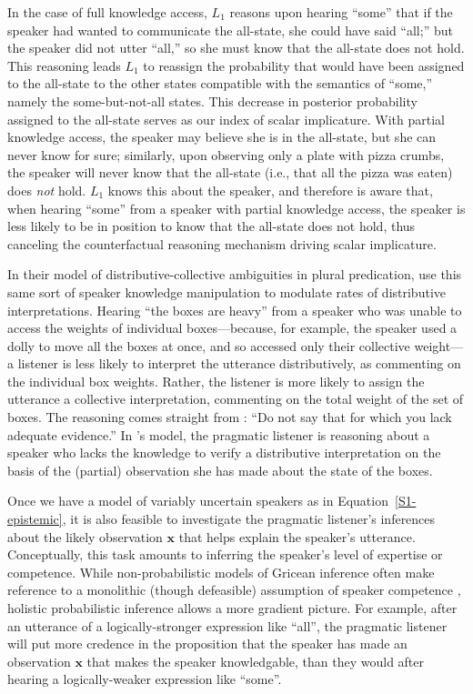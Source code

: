 \documentclass[10pt,letterpaper]{article}
\begin{document}
In the case of full knowledge access, $L_1$ reasons upon hearing ``some'' that if the speaker had wanted to communicate the all-state, she could have said ``all;'' but the speaker did not utter ``all,'' so she must know that the all-state does not hold. This reasoning leads $L_1$ to reassign the probability that would have been assigned to the all-state to the other states compatible with the semantics of ``some,'' namely the some-but-not-all states. This decrease in posterior probability assigned to the all-state serves as our index of scalar implicature. With partial knowledge access, the speaker may believe she is in the all-state, but she can never know for sure; similarly, upon observing only a plate with pizza crumbs, the speaker will never know that the all-state (i.e., that all the pizza was eaten) does \emph{not} hold. $L_1$ knows this about the speaker, and therefore is aware that, when hearing ``some'' from a speaker with partial knowledge access, the speaker is less likely to be in position to know that the all-state does not hold, thus canceling the counterfactual reasoning mechanism driving scalar implicature.

In their model of distributive-collective ambiguities in plural predication, \cite{scontrasgoodman2017} use this same sort of speaker knowledge manipulation to modulate rates of distributive interpretations. Hearing ``the boxes are heavy'' from a speaker who was unable to access the weights of individual boxes---because, for example, the speaker used a dolly to move all the boxes at once, and so accessed only their collective weight---a listener is less likely to interpret the utterance distributively, as commenting on the individual box weights. Rather, the listener is more likely to assign the utterance a collective interpretation, commenting on the total weight of the set of boxes. The reasoning comes straight from \cite{Grice1975:Logic-and-Conve}: ``Do not say that for which you lack adequate evidence.'' In \cite{scontrasgoodman2017}'s model, the pragmatic listener is reasoning about a speaker who lacks the knowledge to verify a distributive interpretation on the basis of the (partial) observation she has made about the state of the boxes.

Once we have a model of variably uncertain speakers as in Equation~\eqref{S1-epistemic}, it is also feasible to investigate the pragmatic listener's inferences about the likely observation $\textbf{x}$ that helps explain the speaker's utterance.
Conceptually, this task amounts to inferring the speaker's level of expertise or competence.
While non-probabilistic models of Gricean inference often make reference to a monolithic (though defeasible) assumption of speaker competence \cite{Geurts2010:Quantity-Implic,vanRooijSchulz:ExhaustiveInterpretation,Spector2006:Scalar-Implicat}, holistic probabilistic inference allows a more gradient picture.
For example, after an utterance of a logically-stronger expression like ``all'', the pragmatic listener will put more credence in the proposition that the speaker has made an observation $\textbf{x}$ that makes the speaker knowledgable, than they would after hearing a logically-weaker expression like ``some''.
\end{document}
